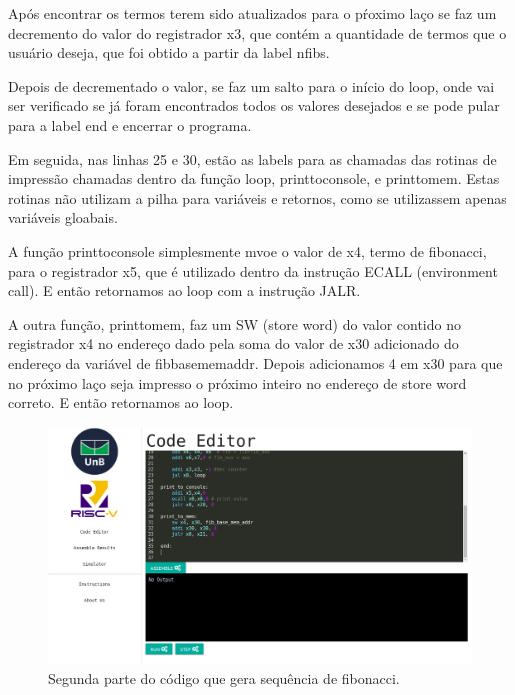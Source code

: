 	Após encontrar os termos terem sido atualizados para o pŕoximo laço se faz um decremento do valor do registrador x3, que contém a quantidade de termos que o usuário deseja, que foi obtido a partir da label n\textunderscore fibs.

	Depois de decrementado o valor, se faz um salto para o início do loop, onde vai ser verificado se já foram encontrados todos os valores desejados e se pode pular para a label end e encerrar o programa. 

	Em seguida, nas linhas 25 e 30, estão as labels para as chamadas das rotinas de impressão chamadas dentro da função loop, print\textunderscore to\textunderscore console, e print\textunderscore to\textunderscore mem. Estas rotinas não utilizam a pilha para variáveis e retornos, como se utilizassem apenas variáveis gloabais.

	A função print\textunderscore to\textunderscore console simplesmente mvoe o valor de x4, termo de fibonacci, para o registrador x5, que é utilizado dentro da instrução ECALL (environment call). E então retornamos ao loop com a instrução JALR.

	A outra função, print\textunderscore to\textunderscore mem, faz um SW (store word) do valor contido no registrador x4 no endereço dado pela soma do valor de x30 adicionado do endereço da variável de fib\textunderscore base\textunderscore mem\textunderscore addr. Depois adicionamos 4 em x30 para que no próximo laço seja impresso o próximo inteiro no endereço de store word correto. E então retornamos ao loop.

	\begin{figure}[h]
	  \centering
	  \includegraphics[width=14cm]{img/fibonacci_codigo_2.png}
	  \caption{Segunda parte do código que gera sequência de fibonacci.}
	  \label{fig:fib-codigo-2}
	\end{figure}

